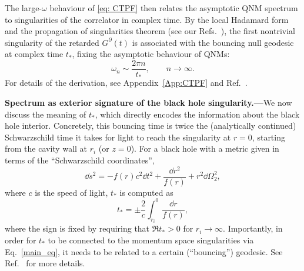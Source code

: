 \documentclass[prd,aps,twocolumn,amsfonts,showpacs,superscriptaddress,preprintnumbers,nofootinbib]{revtex4-2}
\begin{document}
The large-$\omega$ behaviour of \eqref{eq: CTPF} then relates the asymptotic QNM spectrum to singularities of the correlator in complex time. By the local Hadamard form and the propagation of singularities theorem (see our Refs.~\cite{Grozdanov:2026cut,Grozdanov:2026ktq}), the first nontrivial singularity of the retarded $G^\partial(t)$ is associated with the bouncing null geodesic at complex time $t_*$, fixing the asymptotic behaviour of QNMs:
\begin{equation}
\label{main_eq}
    \omega_n\sim\frac{2\pi n}{t_*},
    \qquad n\to\infty .
\end{equation}
For details of the derivation, see Appendix~\ref{App:CTPF} and Ref.~\cite{Grozdanov:2026ktq}. 


{\bf Spectrum as exterior signature of the black hole singularity.---}We now discuss the meaning of $t_*$, which directly encodes the information about the black hole interior. Concretely, this bouncing time is twice the (analytically continued) Schwarzschild time it takes for light to reach the singularity at $r=0$, starting from the cavity wall at $r_i$ (or $z=0$). For a black hole with a metric given in terms of the ``Schwarzschild coordinates'',
\begin{equation}
    \dd s^2=-f(r)c^2\dd t^2+\frac{\dd r^2}{f(r)}+r^2\dd\Omega_2^{2},
\end{equation}
where $c$ is the speed of light, $t_*$ is computed as
\begin{equation}\label{e.rubber_ducks_look_so_real}
    t_*=\pm\frac{2}{c}\int_{r_i}^0\frac{\dd r}{f(r)},
\end{equation}
where the sign is fixed by requiring that $\Re t_*>0$ for $r_i\to\infty$. Importantly, in order for $t_*$ to be connected to the momentum space singularities via Eq.~\eqref{main_eq}, it needs to be related to a certain (``bouncing'') geodesic. See Ref.~\cite{Grozdanov:2026cut} for more details. 
\end{document}
